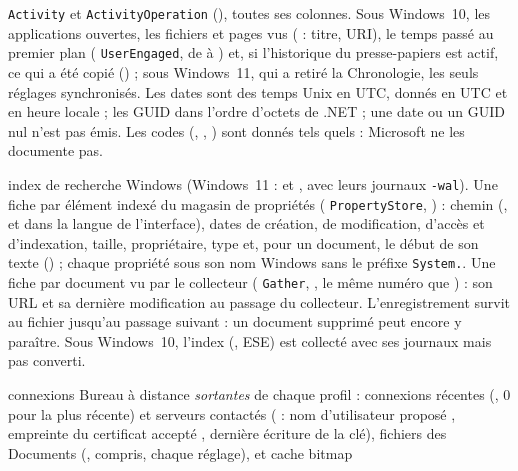 \documentclass[11pt,a4paper,oneside]{report}
\begin{document}
\begin{description}[style=nextline,leftmargin=1.2em]
        \texttt{Activity} et \texttt{ActivityOperation} (),
        toutes ses colonnes. Sous Windows~10, les applications ouvertes, les
        fichiers et pages vus ( : titre, URI), le temps passé
        au premier plan ( \texttt{UserEngaged}, de
         à ) et, si l'historique du
        presse-papiers est actif, ce qui a été copié
        () ; sous Windows~11, qui a retiré la
        Chronologie, les seuls réglages synchronisés. Les dates sont des temps
        Unix en UTC, donnés en UTC et en heure locale ; les GUID dans l'ordre
        d'octets de .NET ; une date ou un GUID nul n'est pas émis. Les codes
        (, ,
        ) sont donnés tels quels : Microsoft ne les
        documente pas.
  \item[\fichier{search\_index.json}] index de recherche Windows
        (Windows~11 :  et ,
        avec leurs journaux \texttt{-wal}). Une fiche par élément indexé du
        magasin de propriétés ( \texttt{PropertyStore},
        ) : chemin (, et
         dans la langue de l'interface), dates de
        création, de modification, d'accès et d'indexation, taille,
        propriétaire, type et, pour un document, le début de son texte
        () ; chaque propriété sous son nom Windows
        sans le préfixe \texttt{System.}. Une fiche par document vu par le
        collecteur ( \texttt{Gather}, , le
        même numéro que ) : son URL et sa dernière modification
        au passage du collecteur. L'enregistrement survit au fichier jusqu'au
        passage suivant : un document supprimé peut encore y paraître. Sous
        Windows~10, l'index (, ESE) est collecté avec
        ses journaux mais pas converti.
  \item[\fichier{rdp\_client.json}] connexions Bureau à distance \emph{sortantes} de
        chaque profil : connexions récentes (,
         0 pour la plus récente) et serveurs contactés
        ( : nom d'utilisateur proposé ,
        empreinte du certificat accepté , dernière écriture de
        la clé), fichiers  des Documents (,
         compris, chaque réglage), et cache bitmap

\end{description}
\end{document}
